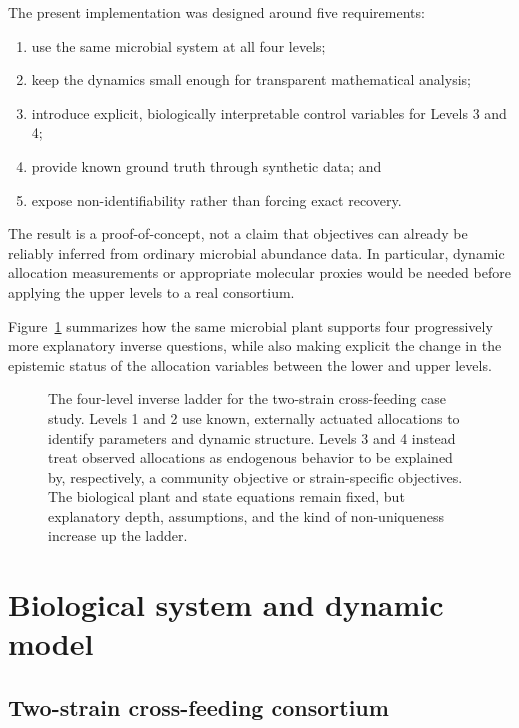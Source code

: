\documentclass[11pt,a4paper]{article}
\begin{document}
The present implementation was designed around five requirements:
\begin{enumerate}
  \item use the same microbial system at all four levels;
  \item keep the dynamics small enough for transparent mathematical analysis;
  \item introduce explicit, biologically interpretable control variables for
        Levels 3 and 4;
  \item provide known ground truth through synthetic data; and
  \item expose non-identifiability rather than forcing exact recovery.
\end{enumerate}

The result is a proof-of-concept, not a claim that objectives can already be
reliably inferred from ordinary microbial abundance data. In particular,
dynamic allocation measurements or appropriate molecular proxies would be
needed before applying the upper levels to a real consortium.

Figure~\ref{fig:inverse-ladder-overview} summarizes how the same microbial
plant supports four progressively more explanatory inverse questions, while
also making explicit the change in the epistemic status of the allocation
variables between the lower and upper levels.

\begin{figure}[H]
\centering
\resizebox{\textwidth}{!}{%
}
\caption{The four-level inverse ladder for the two-strain cross-feeding case
study. Levels 1 and 2 use known, externally actuated allocations to identify
parameters and dynamic structure. Levels 3 and 4 instead treat observed
allocations as endogenous behavior to be explained by, respectively, a
community objective or strain-specific objectives. The biological plant and
state equations remain fixed, but explanatory depth, assumptions, and the
kind of non-uniqueness increase up the ladder.}
\label{fig:inverse-ladder-overview}
\end{figure}

\section{Biological system and dynamic model}

\subsection{Two-strain cross-feeding consortium}
\end{document}
